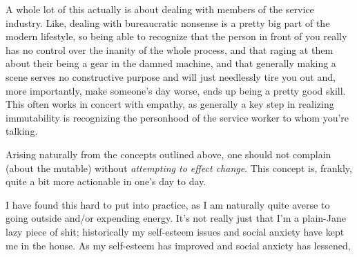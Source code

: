 \documentclass[../butidigress.tex]{subfiles}
\begin{document}
A whole lot of this actually is about dealing with members of the service industry.
Like, dealing with bureaucratic nonsense is a pretty big part of the modern lifestyle, so being able to recognize that the person in front of you really has no control over the inanity of the whole process, and that raging at them about their being a gear in the damned machine, and that generally making a scene serves no constructive purpose and will just needlessly tire you out and, more importantly, make someone's day worse, ends up being a pretty good skill.
This often works in concert with empathy, as generally a key step in realizing immutability is recognizing the personhood of the service worker to whom you're talking.

Arising naturally from the concepts outlined above, one should not complain (about the mutable) without \emph{attempting to effect change}.
This concept is, frankly, quite a bit more actionable in one's day to day.

I have found this hard to put into practice, as I am naturally quite averse to going outside and/or expending energy.
It's not really just that I'm a plain-Jane lazy piece of shit; historically my self-esteem issues and social anxiety have kept me in the house.
As my self-esteem has improved and social anxiety has lessened,
\end{document}
